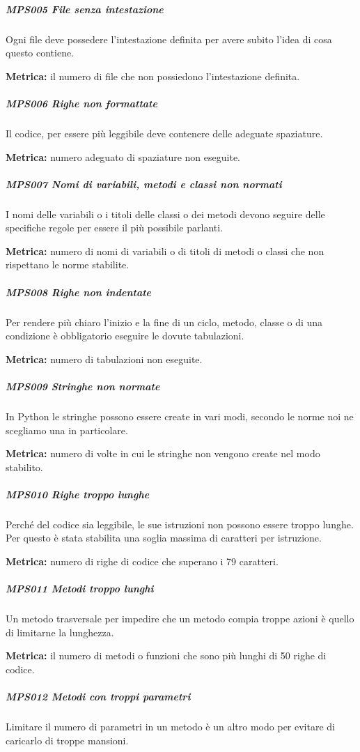         \subparagraph{MPS005 File senza intestazione}
        Ogni file deve possedere l'intestazione definita per avere subito l'idea di cosa questo contiene.

        \textbf{Metrica:} il numero di file che non possiedono l'intestazione definita.

        \subparagraph{MPS006 Righe non formattate}
        Il codice, per essere più leggibile deve contenere delle adeguate spaziature.

        \textbf{Metrica:} numero adeguato di spaziature non eseguite.

        \subparagraph{MPS007 Nomi di variabili, metodi e classi non normati}
        I nomi delle variabili o i titoli delle classi o dei metodi devono seguire delle specifiche regole per essere il più possibile parlanti.

        \textbf{Metrica:} numero di nomi di variabili o di titoli di metodi o classi che non rispettano le norme stabilite.

        \subparagraph{MPS008 Righe non indentate}
        Per rendere più chiaro l'inizio e la fine di un ciclo, metodo, classe
        o di una condizione è obbligatorio eseguire le dovute tabulazioni.

        \textbf{Metrica:} numero di tabulazioni non eseguite.

        \subparagraph{MPS009 Stringhe non normate}
        In Python le stringhe possono essere create in vari modi, secondo le norme noi ne scegliamo una in particolare.

        \textbf{Metrica:} numero di volte in cui le stringhe non vengono create nel modo stabilito.

        \subparagraph{MPS010 Righe troppo lunghe}
        Perché del codice sia leggibile, le sue istruzioni non possono essere troppo lunghe. Per questo è stata stabilita una soglia massima di caratteri per istruzione.

        \textbf{Metrica:} numero di righe di codice che superano i 79 caratteri.

        \subparagraph{MPS011 Metodi troppo lunghi}
        Un metodo trasversale per impedire che un metodo compia troppe azioni è quello di limitarne la lunghezza.

        \textbf{Metrica:} il numero di metodi o funzioni che sono più lunghi di 50 righe di codice.

        \subparagraph{MPS012 Metodi con troppi parametri}
        Limitare il numero di parametri in un metodo è un altro modo per evitare di caricarlo di troppe mansioni.

